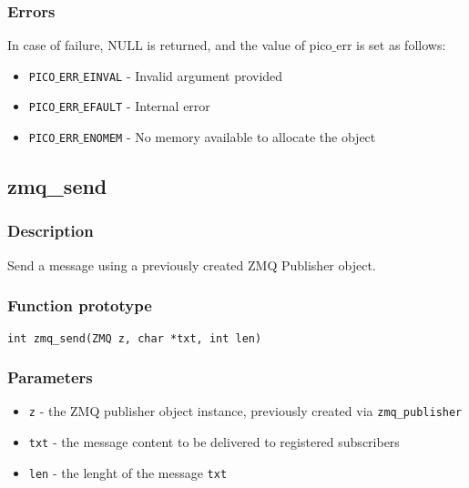 \subsubsection*{Errors}
In case of failure, NULL is returned, and the value of pico$\_$err
is set as follows:

\begin{itemize}[noitemsep]
\item \texttt{PICO$\_$ERR$\_$EINVAL}          - Invalid argument provided
\item \texttt{PICO$\_$ERR$\_$EFAULT}          - Internal error
\item \texttt{PICO$\_$ERR$\_$ENOMEM}          - No memory available to allocate the object
\end{itemize}


\subsection{zmq\_send}
\subsubsection*{Description}
Send a message using a previously created ZMQ Publisher object.

\subsubsection*{Function prototype}
\begin{verbatim}
int zmq_send(ZMQ z, char *txt, int len)
\end{verbatim}

\subsubsection*{Parameters}
\begin{itemize}[noitemsep]
\item \texttt{z} - the ZMQ publisher object instance, previously created via \texttt{zmq\_publisher} 
\item \texttt{txt} - the message content to be delivered to registered subscribers 
\item \texttt{len} - the lenght of the message \texttt{txt} 
\end{itemize}

